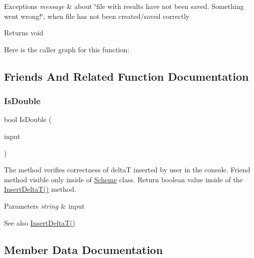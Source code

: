 \begin{DoxyExceptions}{Exceptions}
{\em message} & about \char`\"{}file with results have not been saved. Something went wrong!\char`\"{}, when file has not been created/saved correctly \\
\hline
\end{DoxyExceptions}
\begin{DoxyReturn}{Returns}
void 
\end{DoxyReturn}
Here is the caller graph for this function\+:


\subsection{Friends And Related Function Documentation}
\mbox{\label{class_scheme_ad9aa7a2eac63a3a91e6efc3d8a8093cd}} 
\subsubsection{\texorpdfstring{Is\+Double}{IsDouble}}
{\footnotesize\ttfamily bool Is\+Double (\begin{DoxyParamCaption}\item[{string}]{input }\end{DoxyParamCaption})\hspace{0.3cm}{\ttfamily [friend]}}

The method verifies correctness of deltaT inserted by user in the console. Friend method visible only inside of \mbox{\hyperlink{class_scheme}{Scheme}} class. Return boolean value inside of the \mbox{\hyperlink{class_scheme_ac5803e4951dc125b274f543d5037c21d}{Insert\+Delta\+T()}} method. 
\begin{DoxyParams}{Parameters}
{\em string} & input \\
\hline
\end{DoxyParams}
\begin{DoxySeeAlso}{See also}
\mbox{\hyperlink{class_scheme_ac5803e4951dc125b274f543d5037c21d}{Insert\+Delta\+T()}} 
\end{DoxySeeAlso}


\subsection{Member Data Documentation}
\mbox{\label{class_scheme_aaaf978f98d30bd96ea56a9387d1b2c5a}} 
